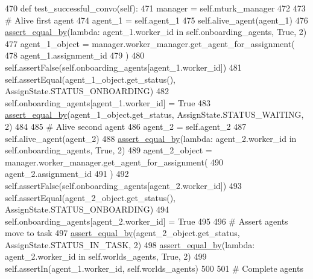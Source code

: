 \begin{DoxyCode}
470     \textcolor{keyword}{def }test\_successful\_convo(self):
471         manager = self.mturk\_manager
472 
473         \textcolor{comment}{# Alive first agent}
474         agent\_1 = self.agent\_1
475         self.alive\_agent(agent\_1)
476         \hyperlink{namespaceparlai_1_1mturk_1_1core_1_1test_1_1test__full__system_a0b463246d35658a2e422010f13dcf819}{assert\_equal\_by}(\textcolor{keyword}{lambda}: agent\_1.worker\_id \textcolor{keywordflow}{in} self.onboarding\_agents, \textcolor{keyword}{True}, 2)
477         agent\_1\_object = manager.worker\_manager.get\_agent\_for\_assignment(
478             agent\_1.assignment\_id
479         )
480         self.assertFalse(self.onboarding\_agents[agent\_1.worker\_id])
481         self.assertEqual(agent\_1\_object.get\_status(), AssignState.STATUS\_ONBOARDING)
482         self.onboarding\_agents[agent\_1.worker\_id] = \textcolor{keyword}{True}
483         \hyperlink{namespaceparlai_1_1mturk_1_1core_1_1test_1_1test__full__system_a0b463246d35658a2e422010f13dcf819}{assert\_equal\_by}(agent\_1\_object.get\_status, AssignState.STATUS\_WAITING, 2)
484 
485         \textcolor{comment}{# Alive second agent}
486         agent\_2 = self.agent\_2
487         self.alive\_agent(agent\_2)
488         \hyperlink{namespaceparlai_1_1mturk_1_1core_1_1test_1_1test__full__system_a0b463246d35658a2e422010f13dcf819}{assert\_equal\_by}(\textcolor{keyword}{lambda}: agent\_2.worker\_id \textcolor{keywordflow}{in} self.onboarding\_agents, \textcolor{keyword}{True}, 2)
489         agent\_2\_object = manager.worker\_manager.get\_agent\_for\_assignment(
490             agent\_2.assignment\_id
491         )
492         self.assertFalse(self.onboarding\_agents[agent\_2.worker\_id])
493         self.assertEqual(agent\_2\_object.get\_status(), AssignState.STATUS\_ONBOARDING)
494         self.onboarding\_agents[agent\_2.worker\_id] = \textcolor{keyword}{True}
495 
496         \textcolor{comment}{# Assert agents move to task}
497         \hyperlink{namespaceparlai_1_1mturk_1_1core_1_1test_1_1test__full__system_a0b463246d35658a2e422010f13dcf819}{assert\_equal\_by}(agent\_2\_object.get\_status, AssignState.STATUS\_IN\_TASK, 2)
498         \hyperlink{namespaceparlai_1_1mturk_1_1core_1_1test_1_1test__full__system_a0b463246d35658a2e422010f13dcf819}{assert\_equal\_by}(\textcolor{keyword}{lambda}: agent\_2.worker\_id \textcolor{keywordflow}{in} self.worlds\_agents, \textcolor{keyword}{True}, 2)
499         self.assertIn(agent\_1.worker\_id, self.worlds\_agents)
500 
501         \textcolor{comment}{# Complete agents}

\end{DoxyCode}

